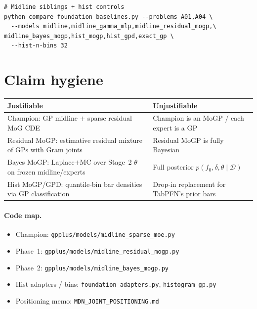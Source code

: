 \documentclass[11pt,a4paper]{article}
\newcommand{\Dcal}{\mathcal{D}}
\theoremstyle{definition}
\begin{document}
\begin{verbatim}
# Midline siblings + hist controls
python compare_foundation_baselines.py --problems A01,A04 \
  --models midline,midline_gamma_mlp,midline_residual_mogp,\
midline_bayes_mogp,hist_mogp,hist_gpd,exact_gp \
  --hist-n-bins 32
\end{verbatim}

\section{Claim hygiene}

\begin{center}
\renewcommand{\arraystretch}{1.15}
\begin{tabular}{@{}p{5.8cm}p{5.8cm}@{}}
\toprule
\textbf{Justifiable} & \textbf{Unjustifiable} \\
\midrule
Champion: GP midline $+$ sparse residual MoG CDE &
  Champion is an MoGP / each expert is a GP \\
Residual MoGP: estimative residual mixture of GPs with Gram joints &
  Residual MoGP is fully Bayesian \\
Bayes MoGP: Laplace$+$MC over Stage~2 $\theta$ on frozen midline/experts &
  Full posterior $p(f_0,\delta,\theta\mid\Dcal)$ \\
Hist MoGP/GPD: quantile-bin bar densities via GP classification &
  Drop-in replacement for TabPFN's prior bars \\
\bottomrule
\end{tabular}
\end{center}

\paragraph{Code map.}
\begin{itemize}[leftmargin=1.2em,itemsep=1pt]
\item Champion:
  \texttt{gpplus/models/midline\_sparse\_moe.py}
\item Phase~1:
  \texttt{gpplus/models/midline\_residual\_mogp.py}
\item Phase~2:
  \texttt{gpplus/models/midline\_bayes\_mogp.py}
\item Hist adapters / bins:
  \texttt{foundation\_adapters.py}, \texttt{histogram\_gp.py}
\item Positioning memo:
  \texttt{MDN\_JOINT\_POSITIONING.md}
\end{itemize}
\end{document}
